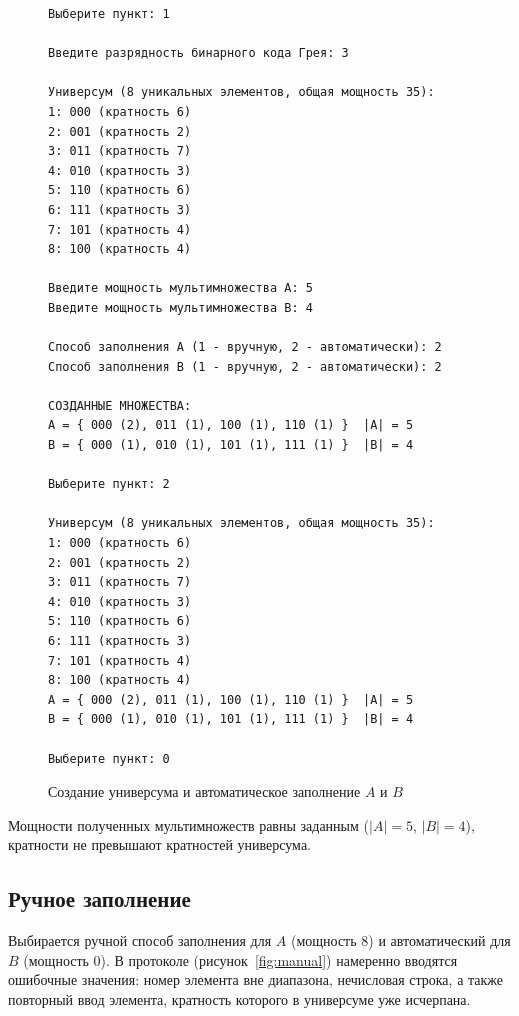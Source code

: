 \documentclass[14pt,a4paper]{extarticle}
\newcommand{\codefont}{\renewcommand{\baselinestretch}{1}\monofont\fontsize{10}{12}\selectfont}
\newcommand{\card}[1]{\left|#1\right|}
\begin{document}
\begin{figure}[H]
\begin{Verbatim}[frame=single,framesep=4pt,breaklines=true,formatcom=\codefont]
Выберите пункт: 1

Введите разрядность бинарного кода Грея: 3

Универсум (8 уникальных элементов, общая мощность 35):
1: 000 (кратность 6)
2: 001 (кратность 2)
3: 011 (кратность 7)
4: 010 (кратность 3)
5: 110 (кратность 6)
6: 111 (кратность 3)
7: 101 (кратность 4)
8: 100 (кратность 4)

Введите мощность мультимножества A: 5
Введите мощность мультимножества B: 4

Способ заполнения A (1 - вручную, 2 - автоматически): 2
Способ заполнения B (1 - вручную, 2 - автоматически): 2

СОЗДАННЫЕ МНОЖЕСТВА:
A = { 000 (2), 011 (1), 100 (1), 110 (1) }  |A| = 5
B = { 000 (1), 010 (1), 101 (1), 111 (1) }  |B| = 4

Выберите пункт: 2

Универсум (8 уникальных элементов, общая мощность 35):
1: 000 (кратность 6)
2: 001 (кратность 2)
3: 011 (кратность 7)
4: 010 (кратность 3)
5: 110 (кратность 6)
6: 111 (кратность 3)
7: 101 (кратность 4)
8: 100 (кратность 4)
A = { 000 (2), 011 (1), 100 (1), 110 (1) }  |A| = 5
B = { 000 (1), 010 (1), 101 (1), 111 (1) }  |B| = 4

Выберите пункт: 0
\end{Verbatim}
\caption{Создание универсума и автоматическое заполнение $A$ и $B$}\label{fig:auto}
\end{figure}

Мощности полученных мультимножеств равны заданным ($\card{A}=5$, $\card{B}=4$), кратности не превышают кратностей универсума.

\subsection{Ручное заполнение}

Выбирается ручной способ заполнения для $A$ (мощность 8) и автоматический для $B$ (мощность 0). В протоколе (рисунок~\ref{fig:manual}) намеренно вводятся ошибочные значения: номер элемента вне диапазона, нечисловая строка, а также повторный ввод элемента, кратность которого в универсуме уже исчерпана.
\end{document}
